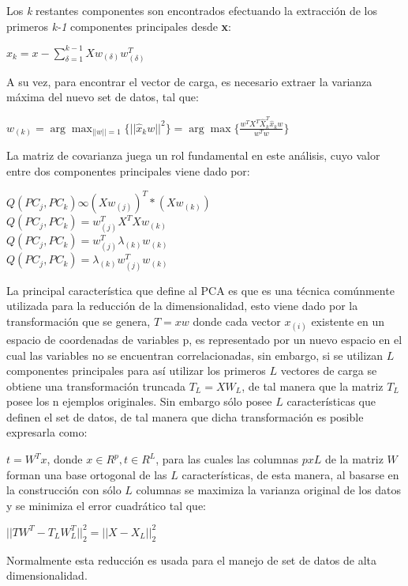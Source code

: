 Los \textit{k} restantes componentes son encontrados efectuando la extracción de los primeros \textit{k-1} componentes principales desde \textbf{x}:

$\hat{x}_{k} = x - \sum_{\delta=1}^{k-1}Xw_{(\delta)}w^{T}_{(\delta)}$

A su vez, para encontrar el vector de carga, es necesario extraer la varianza máxima del nuevo set de datos, tal que:

$w_{(k)} = \arg \max_{||w||=1} \{||\hat{x}_{k}w||^{2}\} = \arg \max \{\frac{w^{T}X^{T}\hat{X}^{T}_{k}\hat{x}_{k}w}{w^{T}w}\}$

La matriz de covarianza juega un rol fundamental en este análisis, cuyo valor entre dos componentes principales viene dado por:
\begin{flushleft}
	$Q(PC_{j}, PC_{k}) \infty (Xw_{(j)})^{T} * (Xw_{(k)})$\\
	$Q(PC_{j}, PC_{k}) = w_{(j)}^{T}X^{T}Xw_{(k)}$\\
	$Q(PC_{j}, PC_{k}) = w_{(j)}^{T}\lambda_{(k)}w_{(k)}$\\
	$Q(PC_{j}, PC_{k}) = \lambda_{(k)}w_{(j)}^{T}w_{(k)}$	
\end{flushleft}


La principal característica que define al PCA es que es una técnica comúnmente utilizada para la reducción de la dimensionalidad, esto viene dado por la transformación que se genera, $ T = xw $ donde cada vector $ x_{(i)} $ existente en un espacio de coordenadas de variables p, es representado por un nuevo espacio en el cual las variables no se encuentran correlacionadas, sin embargo, si se utilizan $ L $ componentes principales para así utilizar los primeros $ L $ vectores de carga se obtiene una transformación truncada $ T_{L} = XW_{L} $, de tal manera que la matriz $ T_{L} $ posee los n ejemplos originales. Sin embargo sólo posee $ L $ características que definen el set de datos, de tal manera que dicha transformación es posible expresarla como:

$ t = W^{T}x$, donde $ x \in R^{p}, t \in R^{L}$, para las cuales las columnas $ p x L $ de la matriz $ W $ forman una base ortogonal de las $ L $ características, de esta manera, al basarse en la construcción con sólo $ L $ columnas se maximiza la varianza original de los datos y se minimiza el error cuadrático tal que: 

$|| TW^{T} - T_{L}W_{L}^{T}||^{2}_{2} = ||X - X_{L}||_{2}^{2}$

Normalmente esta reducción es usada para el manejo de set de datos de alta dimensionalidad.

